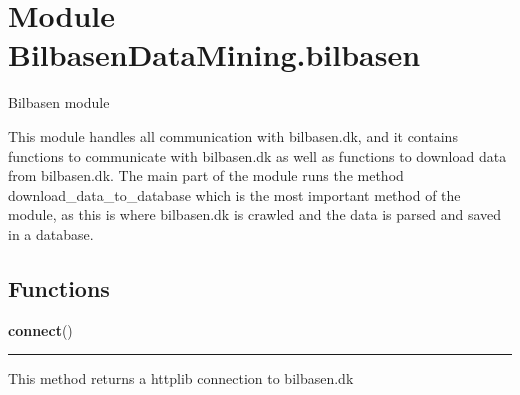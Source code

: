 %
%
%


\section{Module BilbasenDataMining.bilbasen}

    \label{BilbasenDataMining:bilbasen}
Bilbasen module

This module handles all communication with bilbasen.dk, and it contains 
functions to communicate with bilbasen.dk as well as functions to download 
data from bilbasen.dk. The main part of the module runs the method 
download\_data\_to\_database which is the most important method of the 
module, as this is where bilbasen.dk is crawled and the data is parsed and 
saved in a database.



  \subsection{Functions}

    \label{BilbasenDataMining:bilbasen:connect}

    \vspace{0.5ex}

\hspace{.8\funcindent}\begin{boxedminipage}{\funcwidth}

    \raggedright \textbf{connect}()

    \vspace{-1.5ex}

    \rule{\textwidth}{0.5\fboxrule}
\setlength{\parskip}{2ex}
    This method returns a httplib connection to bilbasen.dk

\setlength{\parskip}{1ex}
    \end{boxedminipage}

